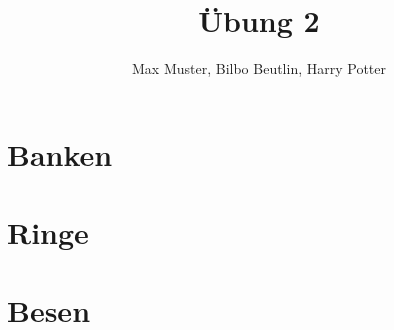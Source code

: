 \documentclass[11pt, a4paper]{scrreprt}
\title{Übung 2}
\author{Max Muster, Bilbo Beutlin, Harry Potter}
\begin{document}
\maketitle
\tableofcontents

\chapter{Banken}


\chapter{Ringe}


\chapter{Besen}

\end{document}
